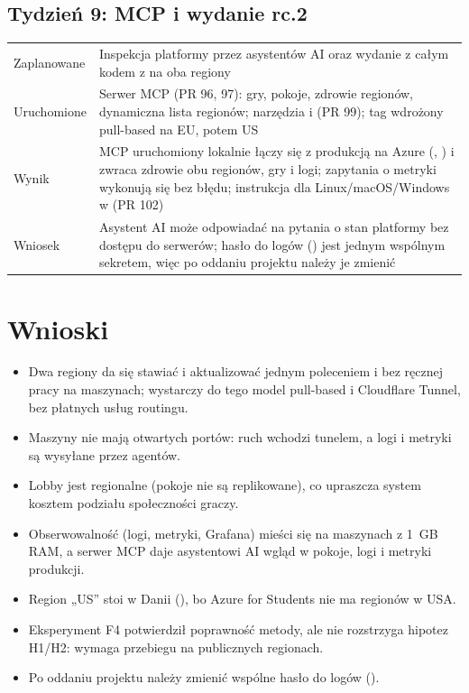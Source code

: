 \section{Tydzień 9: MCP i wydanie rc.2}
\begin{tabularx}{\textwidth}{@{}p{}Y@{}}
\toprule
Zaplanowane & Inspekcja platformy przez asystentów AI oraz wydanie z całym kodem z  na oba regiony \\
Uruchomione & Serwer MCP  (PR 96, 97): gry, pokoje, zdrowie regionów, dynamiczna lista regionów; narzędzia  i  (PR 99); tag  wdrożony pull-based na EU, potem US \\
Wynik & MCP uruchomiony lokalnie łączy się z produkcją na Azure (, ) i zwraca zdrowie obu regionów, gry i logi; zapytania o metryki wykonują się bez błędu; instrukcja dla Linux/macOS/Windows w  (PR 102) \\
Wniosek & Asystent AI może odpowiadać na pytania o stan platformy bez dostępu do serwerów; hasło do logów () jest jednym wspólnym sekretem, więc po oddaniu projektu należy je zmienić \\
\bottomrule
\end{tabularx}

\chapter{Wnioski}\label{ch:real-wnioski}

\begin{itemize}
  \item Dwa regiony da się stawiać i aktualizować jednym poleceniem i bez ręcznej pracy na maszynach; wystarczy
        do tego model pull-based i Cloudflare Tunnel, bez płatnych usług routingu.
  \item Maszyny nie mają otwartych portów: ruch wchodzi tunelem, a logi i metryki są wysyłane przez agentów.
  \item Lobby jest regionalne (pokoje nie są replikowane), co upraszcza system kosztem podziału społeczności graczy.
  \item Obserwowalność (logi, metryki, Grafana) mieści się na maszynach z 1~GB RAM, a serwer MCP daje asystentowi
        AI wgląd w pokoje, logi i metryki produkcji.
  \item Region „US'' stoi w Danii (), bo Azure for Students nie ma regionów w USA.
  \item Eksperyment F4 potwierdził poprawność metody, ale nie rozstrzyga hipotez H1/H2: wymaga przebiegu na
        publicznych regionach.
  \item Po oddaniu projektu należy zmienić wspólne hasło do logów ().
\end{itemize}

